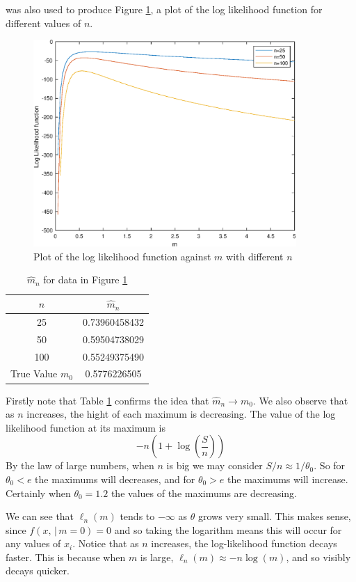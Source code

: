 \documentclass[10pt,a4paper,notitlepage]{article}
\begin{document}
 was also used to produce Figure \ref{fg:3.1}, a plot of the log likelihood function for different values of $n$.
\begin{figure}[H]
\begin{center}
\includegraphics[width=10cm]{Image_3_2}
\caption{Plot of the log likelihood function against $m$ with different $n$}
\label{fg:3.1}
\end{center}
\end{figure}
\begin{table}[H]
\centering
\begin{tabular}{|c|c|}
\hline $n$ & $\widehat{m}_{n}$ \\ \hline 
25 & 0.73960458432 \\
50 & 0.59504738029 \\
100 & 0.55249375490 \\ \hline
True Value $m_{0}$ & 0.5776226505 \\ \hline
\end{tabular}
\caption{$\widehat{m}_{n}$ for data in Figure \ref{fg:3.1}}\label{tb:Q3}
\end{table}

Firstly note that Table \ref{tb:Q3} confirms the idea that $\widehat{m}_{n}\rightarrow m_{0}$. We also observe that as $n$ increases, the hight of each maximum is decreasing. The value of the log likelihood function at its maximum is
\begin{equation}
-n\left(1+\log\left(\frac{S}{n}\right)\right)
\end{equation}
By the law of large numbers, when $n$ is big we may consider $S/n\approx 1/\theta_{0}$. So for $\theta_{0} < e$ the maximums will decreases, and for $\theta_{0}>e$ the maximums will increase. Certainly when $\theta_{0}=1.2$ the values of the maximums are decreasing. \par
We can see that $\ell_{n}\left(m\right)$ tends to $-\infty$ as $\theta$ grows very small. This makes sense, since $f(x,\, |\, m=0)=0$ and so taking the logarithm means this will occur for any values of $x_{i}$. Notice that as $n$ increases, the log-likelihood function decays faster. This is because when $m$ is large, $\ell_{n}(m)\approx -n\log(m)$, and so visibly decays quicker.
\end{document}
